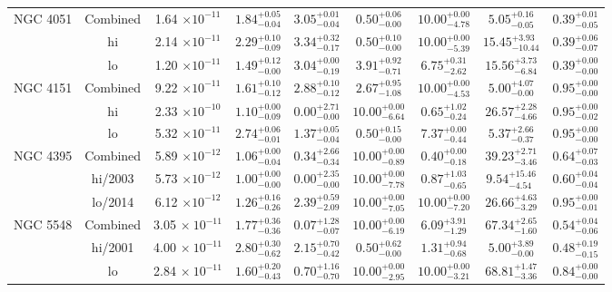 \documentclass{article}
\begin{document}
\begin{landscape}
\begin{longtable}{ccccccccc}
NGC 4051 & Combined & 1.64 $\times 10^{-11}$ & $1.84^{+0.05}_{-0.04}$ & $3.05^{+0.01}_{-0.04}$ & $0.50^{+0.06}_{-0.00}$ & $10.00^{+0.00}_{-4.78}$ & $5.05^{+0.16}_{-0.05}$ & $0.39^{+0.01}_{-0.05}$ \\ 
& hi & 2.14 $\times 10^{-11}$ & $2.29^{+0.10}_{-0.09}$ & $3.34^{+0.32}_{-0.17}$ & $0.50^{+0.10}_{-0.00}$ & $10.00^{+0.00}_{-5.39}$ & $15.45^{+3.93}_{-10.44}$ & $0.39^{+0.06}_{-0.07}$ \\ 
& lo & 1.20 $\times 10^{-11}$ & $1.49^{+0.12}_{-0.00}$ & $3.04^{+0.00}_{-0.19}$ & $3.91^{+0.92}_{-0.71}$ & $6.75^{+0.31}_{-2.62}$ & $15.56^{+3.73}_{-6.84}$ & $0.39^{+0.00}_{-0.00}$ \\ \hline

NGC 4151 & Combined & 9.22 $\times 10^{-11}$ & $1.61^{+0.10}_{-0.12}$ & $2.88^{+0.10}_{-0.12}$ & $2.67^{+0.95}_{-1.08}$ & $10.00^{+0.00}_{-4.53}$ & $5.00^{+4.07}_{-0.00}$ & $0.95^{+0.00}_{-0.00}$ \\
& hi & 2.33 $\times 10^{-10}$ & $1.10^{+0.00}_{-0.09}$ & $0.00^{+2.71}_{-0.00}$ & $10.00^{+0.00}_{-6.64}$ & $0.65^{+1.02}_{-0.24}$ & $26.57^{+2.28}_{-4.66}$ & $0.95^{+0.00}_{-0.02}$ \\
& lo & 5.32 $\times 10^{-11}$ & $2.74^{+0.06}_{-0.01}$ & $1.37^{+0.05}_{-0.04}$ & $0.50^{+0.15}_{-0.00}$ & $7.37^{+0.00}_{-0.44}$ & $5.37^{+2.66}_{-0.37}$ & $0.95^{+0.00}_{-0.00}$ \\ \hline

NGC 4395 & Combined & 5.89 $\times 10^{-12}$ & $1.06^{+0.00}_{-0.04}$ & $0.34^{+2.66}_{-0.34}$ & $10.00^{+0.00}_{-0.89}$ & $0.40^{+0.00}_{-0.18}$ & $39.23^{+2.71}_{-3.46}$ & $0.64^{+0.07}_{-0.03}$\\
& hi/2003  & 5.73 $\times 10^{-12}$ & $1.00^{+0.00}_{-0.00}$  & $0.00^{+2.35}_{-0.00}$ & $10.00^{+0.00}_{-7.78}$ & $0.87^{+1.03}_{-0.65}$ & $9.54^{+15.46}_{-4.54}$ & $0.60^{+0.04}_{-0.04}$\\ 
& lo/2014 & 6.12 $\times 10^{-12}$ & $1.26^{+0.16}_{-0.26}$ & $2.39^{+0.59}_{-2.09}$ & $10.00^{+0.00}_{-7.05}$ & $10.00^{+0.00}_{-7.20}$ & $26.66^{+4.63}_{-3.29}$ & $0.95^{+0.00}_{-0.01}$\\ \hline

NGC 5548 & Combined & 3.05 $\times~10^{-11}$ & $1.77^{+0.36}_{-0.36}$ & $0.07^{+1.28}_{-0.07}$ & $10.00^{+0.00}_{-6.19}$ & $6.09^{+3.91}_{-1.29}$ & $67.34^{+2.65}_{-1.60}$ & $0.54^{+0.04}_{-0.06}$ \\
& hi/2001 & 4.00 $\times~10^{-11}$ & $2.80^{+0.30}_{-0.62}$ & $2.15^{+0.70}_{-0.42}$ & $0.50^{+0.62}_{-0.00}$ & $1.31^{+0.94}_{-0.68}$ & $5.00^{+3.89}_{-0.00}$ & $0.48^{+0.19}_{-0.15}$ \\
& lo & 2.84 $\times~10^{-11}$ & $1.60^{+0.20}_{-0.43}$ & $0.70^{+1.16}_{-0.70}$ & $10.00^{+0.00}_{-2.95}$ & $10.00^{+0.00}_{-3.21}$ & $68.81^{+1.47}_{-3.36}$ & $0.84^{+0.00}_{-0.00}$ \\ \hline


\end{longtable}
\end{landscape}
\end{document}
